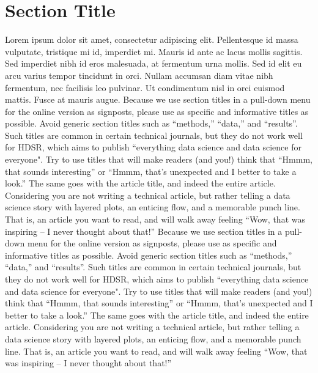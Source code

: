 \documentclass[]{hdsr}
\begin{document}
\section{Section Title}
Lorem ipsum dolor sit amet, consectetur adipiscing elit. Pellentesque id massa vulputate, tristique mi id, imperdiet mi. Mauris id ante ac lacus mollis sagittis. Sed imperdiet nibh id eros malesuada, at fermentum urna mollis. Sed id elit eu arcu varius tempor tincidunt in orci. Nullam accumsan diam vitae nibh fermentum, nec facilisis leo pulvinar. Ut condimentum nisl in orci euismod mattis. Fusce at mauris augue. Because we use section titles in a pull-down menu for the online version as signposts, please use as specific and informative titles as possible. Avoid generic section titles such as ``methods,'' ``data,'' and ``results''. Such titles are common in certain technical journals, but they do not work well for HDSR, which aims to publish ``everything data science and data science for everyone". Try to use titles that will make readers (and you!) think that ``Hmmm, that sounds interesting'' or ``Hmmm, that's unexpected and I better to take a look.''   The same goes with the article title, and indeed the entire article.  Considering you are not writing a technical article, but rather telling a data science story with layered plots, an enticing flow, and a memorable punch line. That is, an article you want to read, and will walk away feeling ``Wow, that was inspiring -- I never thought about that!'' Because we use section titles in a pull-down menu for the online version as signposts, please use as specific and informative titles as possible. Avoid generic section titles such as ``methods,'' ``data,'' and ``results''. Such titles are common in certain technical journals, but they do not work well for HDSR, which aims to publish ``everything data science and data science for everyone". Try to use titles that will make readers (and you!) think that ``Hmmm, that sounds interesting'' or ``Hmmm, that's unexpected and I better to take a look.''   The same goes with the article title, and indeed the entire article.  Considering you are not writing a technical article, but rather telling a data science story with layered plots, an enticing flow, and a memorable punch line. That is, an article you want to read, and will walk away feeling ``Wow, that was inspiring -- I never thought about that!'' 

\restoregeometry
{}
\end{document}
